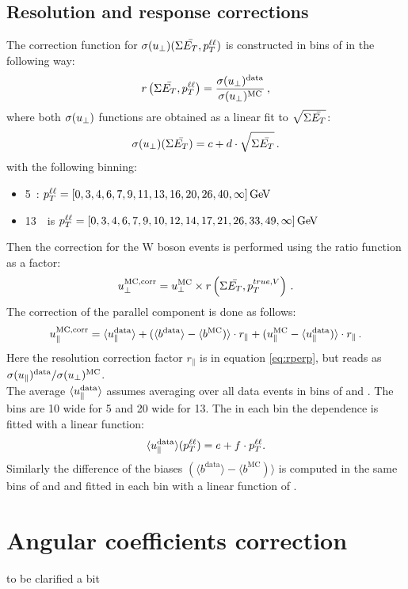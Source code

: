      \subsection{Resolution and response corrections}
     The correction function for $\sigma(u_{\perp})(\Sigma \bar{E_T} ,p_{T}^{\ell\ell})$ is constructed in bins of \ptll in the following way:
     \begin{equation}
     \label{eq:rperp}
     r\left(\Sigma \bar{E_T} ,p_{T}^{\ell\ell}\right) = \frac{\sigma(u_{\perp})^\mathrm{data}
     }{\sigma(u_{\perp})^\mathrm{MC}}\,,
     \end{equation}
     where both $\sigma(u_{\perp})$ functions are obtained as a linear fit to $\sqrt{\Sigma \bar{E_T} }$:
     \begin{equation}
     \sigma(u_{\perp}) (\Sigma \bar{E_T} ) = c + d\cdot\sqrt{\Sigma \bar{E_T} }\,.
     \label{eqn:fitfunc_sigma}
     \end{equation}
     with the following \ptll binning:
     \begin{itemize}
     	\item 5~\TeV: $p_{T}^{\ell\ell} = [ 0, 3, 4, 6, 7, 9, 11, 13, 16, 20, 26, 40, \infty] \,\text{Ge\kern -0.1em V}$
     	\item 13~\TeV\ is $p_{T}^{\ell\ell} = [ 0, 3, 4, 6, 7, 9, 10, 12, 14, 17, 21, 26, 33, 49, \infty]\,\text{Ge\kern -0.1em V}$
     \end{itemize}
 	Then the correction for the W boson events is performed using the ratio function as a factor:
 	\begin{equation}
 	u_{\perp}^{\mathrm{MC,corr}} = u_{\perp}^{\mathrm{MC}} \times
 	r\left(\Sigma \bar{E_T} ,p_T^{true,V}\right)\,.
 	\end{equation}
 	The correction of the parallel component \upar is done as follows:
 	\begin{equation}
 	\upar^\mathrm{MC, corr} = \langle{\upar^\mathrm{data}}\rangle +
 	(\langle{b^\mathrm{data}}\rangle - \langle{b^\mathrm{MC}})\rangle\cdot r_{\parallel} + (\upar^\mathrm{MC} -
 	\langle{\upar^\mathrm{data}})\rangle\cdot r_{\parallel}\,.
 	\label{eq:uparcor}
 	\end{equation}
 	Here the resolution correction factor $r_{\parallel}$ is in equation \ref{eq:rperp}, but reads as $ \sigma(u_{\parallel})^\mathrm{data}/\sigma(u_{\perp})^\mathrm{MC}$. \\
 	The average $\langle{\upar^\mathrm{data}}\rangle$ assumes averaging over all data events in bins of \ptll and \setue. The \setue bins are 10\gev{} wide for 5\tev{} and 20\gev{} wide for 13\tev{}. The in each \setue bin the \ptll dependence is fitted with a linear function: 
 	  \begin{equation}
 	\langle{\upar^\mathrm{data}}\rangle(\ptll) = e + f\cdot\ptll.
 	\label{eqn:fitfunc_upar}
 	\end{equation}  
 	Similarly the difference of the biases $(\langle{b^\mathrm{data}}\rangle - \langle{b^\mathrm{MC}})\rangle$ is computed in the same bins of \ptll and \setue and fitted in each \setue bin with a linear function of \ptll.

	\clearpage
     \section{Angular coefficients correction}
     to be clarified a bit
     